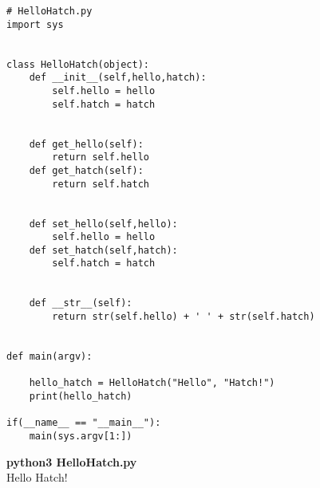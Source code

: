 \documentclass[12pt]{article}
\begin{document}
\pagebreak
\begin{lstlisting}
# HelloHatch.py
import sys

     
class HelloHatch(object):
	def __init__(self,hello,hatch):
		self.hello = hello
		self.hatch = hatch

    
	def get_hello(self):
		return self.hello
	def get_hatch(self):
		return self.hatch

    
	def set_hello(self,hello):
		self.hello = hello
	def set_hatch(self,hatch):
		self.hatch = hatch

    
	def __str__(self):
		return str(self.hello) + ' ' + str(self.hatch)


def main(argv):

	hello_hatch = HelloHatch("Hello", "Hatch!")
	print(hello_hatch)

if(__name__ == "__main__"):
	main(sys.argv[1:])

\end{lstlisting}

\textbf{python3 HelloHatch.py} \\

Hello Hatch!
\end{document}
